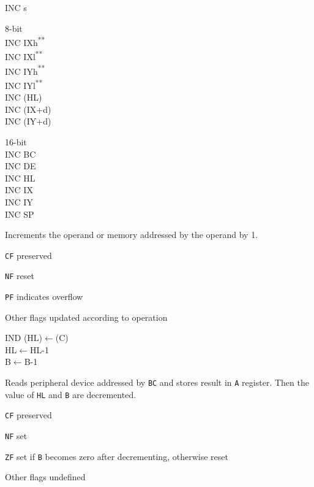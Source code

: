 \documentclass[twoside,openright,a4paper]{book}
\newcommand{\UNDOC}{\textnormal{\textsuperscript{**}}}
\begin{document}
\begin{basedescript}{
	\desclabelstyle{\multilinelabel}
	\desclabelwidth{3cm}}
\begin{detailitem}{INC s}
\begin{DetailVariants}
			\textnormal{8-bit}\\
			INC IXh\UNDOC\\
			INC IXl\UNDOC\\
			INC IYh\UNDOC\\
			INC IYl\UNDOC\\
			INC (HL)\\
			INC (IX+d)\\
			INC (IY+d)

			\textnormal{16-bit}\\
			INC BC\\
			INC DE\\
			INC HL\\
			INC IX\\
			INC IY\\
			INC SP
		\end{DetailVariants}

		Increments the operand or memory addressed by the operand by 1.

		\begin{DetailEffects}
			\item {\tt CF} preserved
			\item {\tt NF} reset
			\item {\tt PF} indicates overflow
			\item Other flags updated according to operation
		\end{DetailEffects}
				
		\begin{DetailTiming}
		\end{DetailTiming}

	\end{detailitem}

 	\begin{detailitem}{IND}
		{(HL)$\leftarrow$(C)\\
		HL$\leftarrow$HL-1\\
		B$\leftarrow$B-1}

		Reads peripheral device addressed by {\tt BC} and stores result in {\tt A} register. Then the value of {\tt HL} and {\tt B} are decremented.

		\begin{DetailEffects}
			\item {\tt CF} preserved 
			\item {\tt NF} set
			\item {\tt ZF} set if {\tt B} becomes zero after decrementing, otherwise reset
			\item Other flags undefined
		\end{DetailEffects}
				

\end{detailitem}
\end{basedescript}
\end{document}
